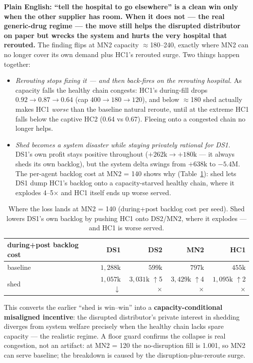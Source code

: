 \documentclass[11pt]{article}
\newcommand{\up}{$\uparrow$}
\newcommand{\dn}{$\downarrow$}
\begin{document}
\textbf{Plain English: ``tell the hospital to go elsewhere'' is a clean win only when the other
supplier has room. When it does not --- the real generic-drug regime --- the move still helps
the disrupted distributor on paper but wrecks the system and hurts the very hospital that
rerouted.} The finding flips at MN2 capacity $\approx$180--240, exactly where MN2 can no longer
cover its own demand plus HC1's rerouted surge. Two things happen together:

\begin{itemize}\setlength\itemsep{1pt}
\item \emph{Rerouting stops fixing it --- and then back-fires on the rerouting hospital.} As
capacity falls the healthy chain congests: HC1's during-fill drops $0.92\to0.87\to0.64$
(cap $400\to180\to120$), and below $\approx$180 shed actually makes HC1 \emph{worse} than the
baseline natural reroute, until at the extreme HC1 falls below the captive HC2 (0.64 vs 0.67).
Fleeing onto a congested chain no longer helps.
\item \emph{Shed becomes a system disaster while staying privately rational for DS1.} DS1's own
profit stays positive throughout ($+262\mathrm{k}\to+180\mathrm{k}$ --- it always sheds its own
backlog), but the system delta swings from $+638\mathrm{k}$ to $-5.4\mathrm{M}$. The per-agent
backlog cost at MN2 = 140 shows why (Table~\ref{tab:externality}): shed lets DS1 dump HC1's
backlog onto a capacity-starved healthy chain, where it explodes 4--5$\times$ and HC1 itself
ends up worse served.
\end{itemize}

\begin{table}[h]
\centering\small
\caption{Where the loss lands at MN2 = 140 (during+post backlog cost per seed). Shed lowers
DS1's own backlog by pushing HC1 onto DS2/MN2, where it explodes --- and HC1 is worse served.}
\label{tab:externality}
\begin{tabular}{l r r r r}
\toprule
during+post backlog cost & DS1 & DS2 & MN2 & HC1 \\
\midrule
baseline & $1{,}288\mathrm{k}$ & $599\mathrm{k}$ & $797\mathrm{k}$ & $455\mathrm{k}$ \\
shed & $1{,}057\mathrm{k}$ \dn & $3{,}031\mathrm{k}$ \up{}5$\times$ & $3{,}429\mathrm{k}$ \up{}4$\times$ & $1{,}095\mathrm{k}$ \up{}2$\times$ \\
\bottomrule
\end{tabular}
\end{table}

This converts the earlier ``shed is win--win'' into a \textbf{capacity-conditional misaligned
incentive}: the disrupted distributor's private interest in shedding diverges from system
welfare precisely when the healthy chain lacks spare capacity --- the realistic regime. A floor
guard confirms the collapse is real congestion, not an artifact: at MN2 = 120 the
no-disruption fill is 1.001, so MN2 can serve baseline; the breakdown is caused by the
disruption-plus-reroute surge.
\end{document}
